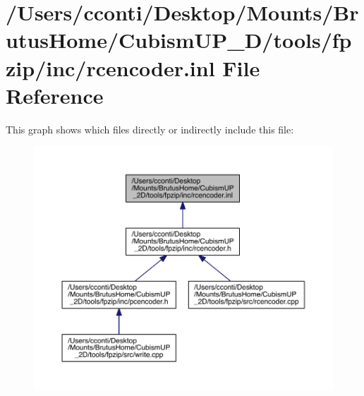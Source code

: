 \hypertarget{rcencoder_8inl}{}\section{/\+Users/cconti/\+Desktop/\+Mounts/\+Brutus\+Home/\+Cubism\+U\+P\+\_\+D/tools/fpzip/inc/rcencoder.inl File Reference}
\label{rcencoder_8inl}
This graph shows which files directly or indirectly include this file\+:\nopagebreak
\begin{figure}[H]
\begin{center}
\leavevmode
\includegraphics[width=350pt]{db/d37/rcencoder_8inl__dep__incl}
\end{center}
\end{figure}
